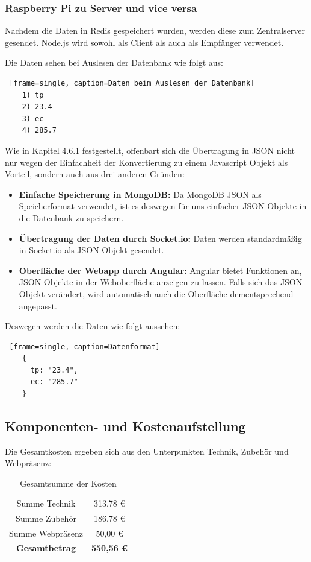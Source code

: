 \newpage
\subsubsection{Raspberry Pi zu Server und vice versa}
Nachdem die Daten in Redis gespeichert wurden, werden diese zum Zentralserver gesendet. Node.js wird sowohl als Client als auch als Empfänger verwendet.

Die Daten sehen bei Auslesen der Datenbank wie folgt aus:
\begin{lstlisting} [frame=single, caption=Daten beim Auslesen der Datenbank]
	1) tp
	2) 23.4
	3) ec
	4) 285.7
\end{lstlisting}

Wie in Kapitel 4.6.1 festgestellt, offenbart sich die \"Ubertragung in \gls{JSON} nicht nur wegen der Einfachheit der Konvertierung zu einem Javascript Objekt als Vorteil, sondern auch aus drei anderen Gr\"unden:
\begin{itemize}
    \item \textbf{Einfache Speicherung in MongoDB:} Da MongoDB \gls{JSON} als Speicherformat verwendet, ist es deswegen f\"ur uns einfacher \gls{JSON}-Objekte in die Datenbank zu speichern.
    \item \textbf{\"Ubertragung der Daten durch Socket.io:} Daten werden standardm\"a{\ss}ig in Socket.io als \gls{JSON}-Objekt gesendet.
    \item \textbf{Oberfl\"ache der Webapp durch Angular:} Angular bietet Funktionen an, \gls{JSON}-Objekte in der Weboberfl\"ache anzeigen zu lassen. Falls sich das \gls{JSON}-Objekt ver\"andert, wird automatisch auch die Oberfl\"ache dementsprechend angepasst.
\end{itemize}

Deswegen werden die Daten wie folgt aussehen:
\begin{lstlisting} [frame=single, caption=Datenformat]
	{
	  tp: "23.4",
	  ec: "285.7"
	}
\end{lstlisting}
\newpage
\subsection{Komponenten- und Kostenaufstellung}
Die Gesamtkosten ergeben sich aus den Unterpunkten Technik, Zubehör und Webpräsenz:
\begin{table}[ht]
{\centering
\begin{tabular}{c|c}
Summe Technik    & 313,78 € \\
Summe Zubehör    & 186,78 € \\
Summe Webpräsenz & 50,00 €  \\ \hline
\textbf{Gesamtbetrag}     & \textbf{550,56 €}
\end{tabular}
\caption{Gesamtsumme der Kosten}}
\end{table}

